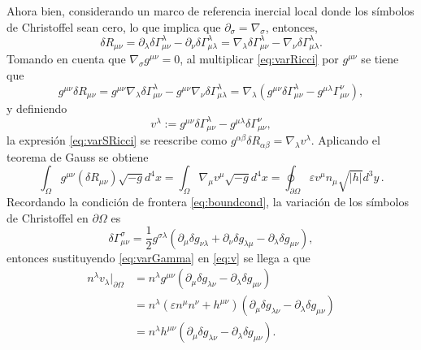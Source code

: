 Ahora bien, considerando un marco de referencia inercial local donde los s\'{i}mbolos de Christoffel sean cero, lo que implica que $\partial_{\sigma} = \nabla_{\sigma}$, entonces,
%
\begin{equation}
\label{eq:varRicci}
\delta R_{\mu \nu} = \partial_{\lambda} \delta \Gamma^{\lambda}_{\mu \nu} - \partial_{\nu} \delta \Gamma^{\lambda}_{\mu \lambda} = \nabla_{\lambda} \delta \Gamma^{\lambda}_{\mu \nu} - \nabla_{\nu} \delta \Gamma^{\lambda}_{\mu \lambda}.
\end{equation}
%
Tomando en cuenta que $\nabla_{\sigma} g^{\mu \nu} = 0$, al multiplicar \eqref{eq:varRicci} por $g^{\mu \nu}$ se tiene que
%
\begin{equation}
\label{eq:varSRicci}
g^{\mu \nu} \delta R_{\mu \nu} = g^{\mu \nu} \nabla_{\lambda} \delta \Gamma^{\lambda}_{\mu \nu} - g^{\mu \nu}\nabla_{\nu} \delta \Gamma^{\lambda}_{\mu \lambda}  = \nabla_{\lambda}(g^{\mu \nu} \delta \Gamma^{\lambda}_{\mu \nu} - g^{\mu \lambda} \Gamma^{\nu}_{\mu \nu}),
\end{equation}
%
y definiendo
%
\begin{equation}
\label{eq:v}
v^{\lambda} := g^{\mu \nu} \delta \Gamma^{\lambda}_{\mu \nu} - g^{\mu \lambda} \delta \Gamma^{\nu}_{\mu \nu},
\end{equation}
la expresi\'{o}n \eqref{eq:varSRicci} se reescribe como $g^{\alpha \beta} \delta R_{\alpha \beta} = \nabla_{\lambda} v^{\lambda}$. Aplicando el teorema de Gauss se obtiene
%
\begin{equation}
\label{eq:intDv}
\int_{\Omega} g^{\mu \nu} \left(  \delta R_{\mu \nu} \right) \sqrt{-g} d^4 x = \int_{\Omega} \nabla_{\mu} v^{\mu} \sqrt{-g} d^4 x = \oint_{\partial \Omega} \varepsilon v^{\mu} n_{\mu} \sqrt{|h|} d^3 y \, .
\end{equation}
%
Recordando la condici\'{o}n de frontera \eqref{eq:boundcond}, la variaci\'{o}n de los s\'{i}mbolos de Christoffel en $\partial \Omega$ es
%
\begin{equation}
\label{eq:varGamma}
\delta \Gamma^{\sigma}_{\mu \nu} = \frac{1}{2} g^{\sigma \lambda} (\partial_{\mu} \delta g_{\nu \lambda} + \partial_{\nu} \delta g_{\lambda \mu} - \partial_{\lambda} \delta g_{\mu \nu}),
\end{equation}
%
entonces sustituyendo \eqref{eq:varGamma} en \eqref{eq:v} se llega a que
%
\begin{align}
\label{eq:vn}
n^{\lambda} v_{\lambda} \Big|_{\partial \Omega} & = n^{\lambda} g^{\mu \nu} (\partial_{\mu} \delta g_{\lambda \nu} - \partial_{\lambda} \delta g_{\mu \nu}) \nonumber \\
& = n^{\lambda} (\varepsilon n^{\mu} n^{\nu} + h^{\mu \nu}) (\partial_{\mu} \delta g_{\lambda \nu} - \partial_{\lambda} \delta g_{\mu \nu}) \nonumber \\
& = n^{\lambda} h^{\mu \nu} (\partial_{\mu} \delta g_{\lambda \nu} - \partial_{\lambda} \delta g_{\mu \nu}).
\end{align}
